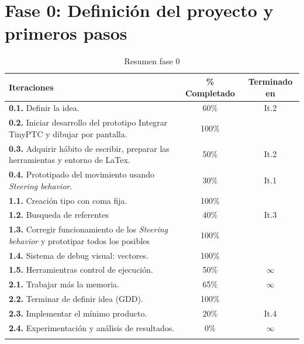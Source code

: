 \section{Fase 0: Definición del proyecto y primeros pasos}
\begin{longtable}[c]{|p{7cm}|c|c|}
\hline
Iteraciones                                               & \% Completado    & Terminado en \\
\hline
\endhead
\textbf{0.1.} Definir la idea.                              & 60\%          & It.2         \\
	\cmidrule[.006pt]{1-3}
\textbf{0.2.} Iniciar desarrollo del prototipo
				Integrar TinyPTC y dibujar por pantalla.    & 100\%         &              \\
	\cmidrule[.006pt]{1-3}
\textbf{0.3.} Adquirir hábito de escribir, preparar
				las herramientas y entorno de LaTex.        & 50\%          & It.2         \\
	\cmidrule[.006pt]{1-3}
\textbf{0.4.} Prototipado del movimiento usando 
				\textit{Steering behavior}.                 & 30\%          & It.1         \\

\cmidrule[1pt]{1-3}

\textbf{1.1.} Creación tipo con coma fija.                  & 100\%         &              \\
	\cmidrule[.006pt]{1-3}
\textbf{1.2.} Busqueda de referentes                        & 40\%          & It.3         \\
	\cmidrule[.006pt]{1-3}
\textbf{1.3.} Corregir funcionamiento de los
				\textit{Steering behavior} y
				prototipar todos los posibles               & 100\%         &              \\
	\cmidrule[.006pt]{1-3}
\textbf{1.4.} Sistema de debug visual: vectores.            & 100\%         &              \\ 
	\cmidrule[.006pt]{1-3}
\textbf{1.5.} Herramientras control de ejecución.           & 50\%          & $\infty$     \\ 

\cmidrule[1pt]{1-3}

\textbf{2.1.} Trabajar más la memoria.                      & 65\%          & $\infty$     \\
	\cmidrule[.006pt]{1-3}
\textbf{2.2.} Terminar de definir idea (GDD).               & 100\%         &              \\
	\cmidrule[.006pt]{1-3}
\textbf{2.3.} Implementar el mínimo producto.               & 20\%          & It.4         \\
	\cmidrule[.006pt]{1-3}
\textbf{2.4.} Experimentación y análisis de resultados.     & 0\%           & $\infty$     \\
\hline
\caption{Resumen fase 0}
\end{longtable}

